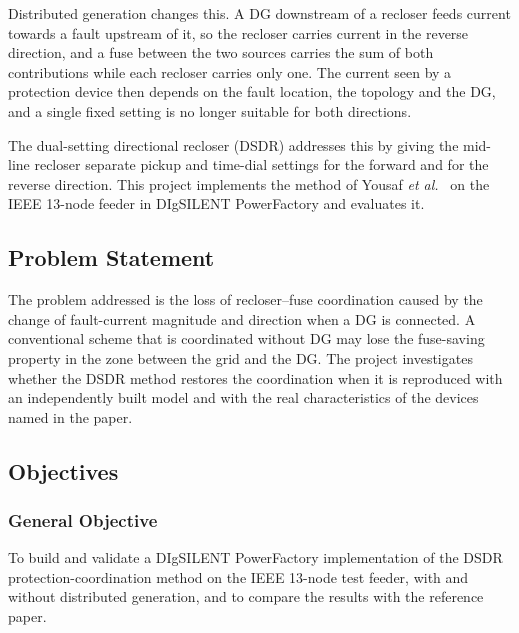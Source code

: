 \documentclass[12pt,letterpaper]{article}
\newcommand{\PF}{PowerFactory}
\begin{document}
Distributed generation changes this. A DG downstream of a recloser feeds current towards a fault upstream of
it, so the recloser carries current in the reverse direction, and a fuse between the two sources carries the
sum of both contributions while each recloser carries only one. The current seen by a protection device then
depends on the fault location, the topology and the DG, and a single fixed setting is no longer suitable for
both directions.

The dual-setting directional recloser (DSDR) addresses this by giving the mid-line recloser separate pickup
and time-dial settings for the forward and for the reverse direction. This project implements the method of
Yousaf \textit{et al.}~\cite{yousaf2022} on the IEEE 13-node feeder in DIgSILENT \PF{} and evaluates it.

\subsection{Problem Statement}
The problem addressed is the loss of recloser--fuse coordination caused by the change of fault-current
magnitude and direction when a DG is connected. A conventional scheme that is coordinated without DG may lose
the fuse-saving property in the zone between the grid and the DG. The project investigates whether the DSDR
method restores the coordination when it is reproduced with an independently built model and with the real
characteristics of the devices named in the paper.

\subsection{Objectives}
\subsubsection{General Objective}
To build and validate a DIgSILENT \PF{} implementation of the DSDR protection-coordination method on the IEEE
13-node test feeder, with and without distributed generation, and to compare the results with the reference
paper.
\end{document}
